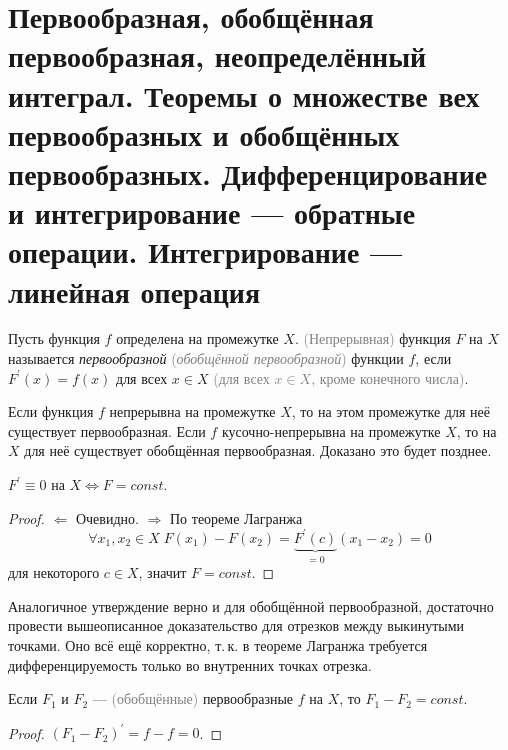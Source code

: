 \section{Первообразная, обобщённая первообразная, неопределённый интеграл. Теоремы о множестве вех первообразных и обобщённых первообразных. Дифференцирование и интегрирование --- обратные операции. Интегрирование --- линейная операция}

\begin{definition}
    Пусть функция $f$ определена на промежутке $X$. \textcolor{gray}{(Непрерывная)} функция $F$ на $X$ называется \textit{первообразной} \textcolor{gray}{(\textit{обобщённой первообразной})} функции $f$, если $F^\prime(x) = f(x)$ для всех $x \in X$ \textcolor{gray}{(для всех $x \in X$, кроме конечного числа)}.
\end{definition}

\begin{remark}
    Если функция $f$ непрерывна на промежутке $X$, то на этом промежутке для неё существует первообразная. Если $f$ кусочно-непрерывна на промежутке $X$, то на $X$ для неё существует обобщённая первообразная. Доказано это будет позднее.
\end{remark}

\begin{statement}
    $F^\prime \equiv 0$ на $X \iff F = const$.
\end{statement}

\begin{proof}
    $\Leftarrow$ Очевидно. $\Rightarrow$ По теореме Лагранжа \[\forall x_1, x_2 \in X\;F(x_1) - F(x_2) = \underbrace{F^\prime(c)}_{{} = 0}(x_1 - x_2) = 0\] для некоторого $c \in X$, значит $F = const$.
\end{proof}

Аналогичное утверждение верно и для обобщённой первообразной, достаточно провести вышеописанное доказательство для отрезков между выкинутыми точками. Оно всё ещё корректно, т.\,к. в теореме Лагранжа требуется дифференцируемость только во внутренних точках отрезка.

\begin{theorem}
    Если $F_1$ и $F_2$ --- \textcolor{gray}{(обобщённые)} первообразные $f$ на $X$, то $F_1 - F_2 = const$.
\end{theorem}

\begin{proof}
    $(F_1 - F_2)^\prime = f - f = 0$.
\end{proof}

